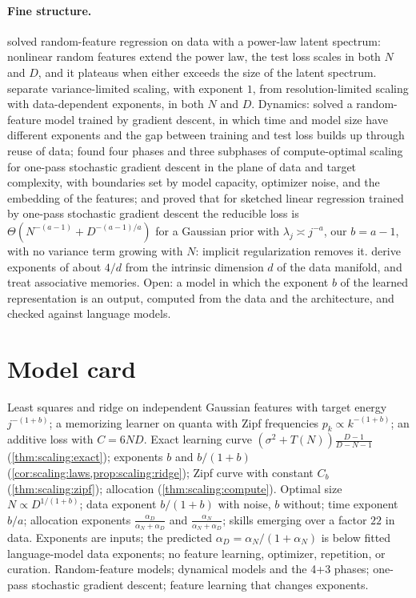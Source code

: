 \begin{refsection}
\paragraph{Fine structure.} \Textcite{MaloneyEtAl2022} solved random-feature regression on data with a power-law latent spectrum: nonlinear random features extend the power law, the test loss scales in both $N$ and $D$, and it plateaus when either exceeds the size of the latent spectrum. \Textcite{BahriEtAl2024} separate variance-limited scaling, with exponent $1$, from resolution-limited scaling with data-dependent exponents, in both $N$ and $D$. Dynamics: \textcite{BordelonEtAl2024} solved a random-feature model trained by gradient descent, in which time and model size have different exponents and the gap between training and test loss builds up through reuse of data; \textcite{PaquetteEtAl2024} found four phases and three subphases of compute-optimal scaling for one-pass stochastic gradient descent in the plane of data and target complexity, with boundaries set by model capacity, optimizer noise, and the embedding of the features; and \textcite{LinEtAl2024} proved that for sketched linear regression trained by one-pass stochastic gradient descent the reducible loss is $\Theta(N^{-(a-1)}+D^{-(a-1)/a})$ for a Gaussian prior with $\lambda_j\asymp j^{-a}$, our $b=a-1$, with no variance term growing with $N$: implicit regularization removes it. \Textcite{SharmaKaplan2022} derive exponents of about $4/d$ from the intrinsic dimension $d$ of the data manifold, and \textcite{CabannesEtAl2024} treat associative memories. Open: a model in which the exponent $b$ of the learned representation is an output, computed from the data and the architecture, and checked against language models.

\section{Model card}\label{sec:scaling:card}

{Least squares and ridge on independent Gaussian features with target energy $j^{-(1+b)}$; a memorizing learner on quanta with Zipf frequencies $p_k\propto k^{-(1+b)}$; an additive loss with $C=6ND$.}
{Exact learning curve $(\sigma^2+T(N))\frac{D-1}{D-N-1}$ (\cref{thm:scaling:exact}); exponents $b$ and $b/(1+b)$ (\cref{cor:scaling:laws,prop:scaling:ridge}); Zipf curve with constant $C_b$ (\cref{thm:scaling:zipf}); allocation (\cref{thm:scaling:compute}).}
{Optimal size $N\propto D^{1/(1+b)}$; data exponent $b/(1+b)$ with noise, $b$ without; time exponent $b/a$; allocation exponents $\frac{\alpha_D}{\alpha_N+\alpha_D}$ and $\frac{\alpha_N}{\alpha_N+\alpha_D}$; skills emerging over a factor $22$ in data.}
{Exponents are inputs; the predicted $\alpha_D=\alpha_N/(1+\alpha_N)$ is below fitted language-model data exponents; no feature learning, optimizer, repetition, or curation.}
{Random-feature models; dynamical models and the 4+3 phases; one-pass stochastic gradient descent; feature learning that changes exponents.}


\end{refsection}
